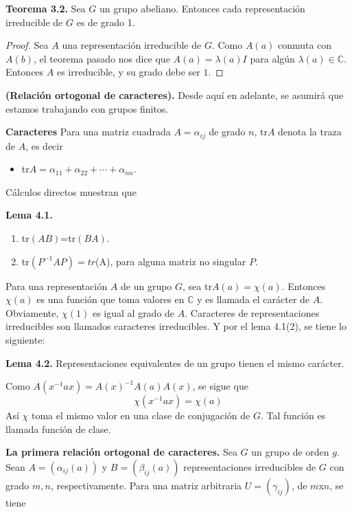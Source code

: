 \documentclass[12pt]{book}
\theoremstyle{definition}
\newcounter{in}
\newcounter{ini}
\begin{document}
\textbf{Teorema 3.2.} Sea $G$ un grupo abeliano. Entonces cada
representación irreducible de $G$ es de grado 1.

\begin{proof}
  Sea $A$ una representación irreducible de $G$. Como $A(a)$ conmuta
  con $A(b)$, el teorema pasado nos dice que $A(a)=\lambda(a) I$ para
  algún $\lambda(a) \in \mathbb{C}$. Entonces $A$ es irreducible, y su
  grado debe ser $1$.
\end{proof}

\textbf{(Relación ortogonal de caracteres).} Desde aquí en adelante,
se asumirá que estamos trabajando con grupos finitos.

\textbf{Caracteres} Para una matriz cuadrada $A=\alpha_{ij}$ de grado
$n$, tr$A$ denota la traza de $A$, es decir
\begin{itemize}
  \item tr$A= \alpha_{11}+ \alpha_{22} + \cdots + \alpha_{nn}$.
\end{itemize}
Cálculos directos muestran que

\textbf{Lema 4.1. }
\begin{enumerate}
\item tr$(AB)$=tr$(BA)$.
\item tr$(P^{-1}AP)=tr$(A), para alguna matriz no singular $P$.
\end{enumerate}

Para una representación $A$ de un grupo $G$, sea
tr$A(a)=\chi(a)$. Entonces $\chi(a)$ es una función que toma valores
en $\mathbb{C}$ y es llamada el carácter de $A$. Obviamente, $\chi(1)$
es igual al grado de $A$. Caracteres de representaciones irreducibles
son llamados caracteres irreducibles. Y por el lema 4.1(2), se tiene
lo siguiente:

\textbf{Lema 4.2. } Representaciones equivalentes de un grupo tienen
el mismo carácter.

Como $A(x^{-1}ax)=A(x)^{-1}A(a)A(x)$, se sigue que
\begin{equation*}
  \chi(x^{-1}ax)=\chi(a)
\end{equation*}  
Así $\chi$ toma el mismo valor en una clase de conjugación de $G$. Tal
función es llamada función de clase.

\textbf{La primera relación ortogonal de caracteres.} Sea $G$ un grupo
de orden $g$. Sean $A=(\alpha_{ij}(a))$ y $B=(\beta_{ij}(a))$ representaciones irreducibles de $G$ con grado $m,n$,
respectivamente. Para una matriz arbitraria $U=(\gamma_{ij})$, de
$m$x$n$, se tiene
\end{document}
